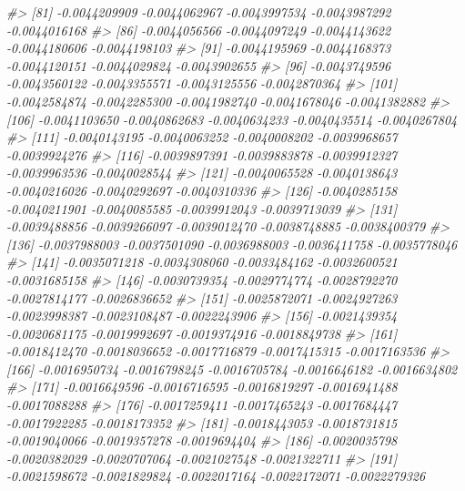\documentclass[
]{article}
\newenvironment{Shaded}{\begin{snugshade}}{\end{snugshade}}
\newcommand{\CommentTok}[1]{\textcolor[rgb]{0.56,0.35,0.01}{\textit{#1}}}
\begin{document}
\begin{Shaded}
\begin{Highlighting}[]
\CommentTok{\#\textgreater{}  [81] {-}0.0044209909 {-}0.0044062967 {-}0.0043997534 {-}0.0043987292 {-}0.0044016168}
\CommentTok{\#\textgreater{}  [86] {-}0.0044056566 {-}0.0044097249 {-}0.0044143622 {-}0.0044180606 {-}0.0044198103}
\CommentTok{\#\textgreater{}  [91] {-}0.0044195969 {-}0.0044168373 {-}0.0044120151 {-}0.0044029824 {-}0.0043902655}
\CommentTok{\#\textgreater{}  [96] {-}0.0043749596 {-}0.0043560122 {-}0.0043355571 {-}0.0043125556 {-}0.0042870364}
\CommentTok{\#\textgreater{} [101] {-}0.0042584874 {-}0.0042285300 {-}0.0041982740 {-}0.0041678046 {-}0.0041382882}
\CommentTok{\#\textgreater{} [106] {-}0.0041103650 {-}0.0040862683 {-}0.0040634233 {-}0.0040435514 {-}0.0040267804}
\CommentTok{\#\textgreater{} [111] {-}0.0040143195 {-}0.0040063252 {-}0.0040008202 {-}0.0039968657 {-}0.0039924276}
\CommentTok{\#\textgreater{} [116] {-}0.0039897391 {-}0.0039883878 {-}0.0039912327 {-}0.0039963536 {-}0.0040028544}
\CommentTok{\#\textgreater{} [121] {-}0.0040065528 {-}0.0040138643 {-}0.0040216026 {-}0.0040292697 {-}0.0040310336}
\CommentTok{\#\textgreater{} [126] {-}0.0040285158 {-}0.0040211901 {-}0.0040085585 {-}0.0039912043 {-}0.0039713039}
\CommentTok{\#\textgreater{} [131] {-}0.0039488856 {-}0.0039266097 {-}0.0039012470 {-}0.0038748885 {-}0.0038400379}
\CommentTok{\#\textgreater{} [136] {-}0.0037988003 {-}0.0037501090 {-}0.0036988003 {-}0.0036411758 {-}0.0035778046}
\CommentTok{\#\textgreater{} [141] {-}0.0035071218 {-}0.0034308060 {-}0.0033484162 {-}0.0032600521 {-}0.0031685158}
\CommentTok{\#\textgreater{} [146] {-}0.0030739354 {-}0.0029774774 {-}0.0028792270 {-}0.0027814177 {-}0.0026836652}
\CommentTok{\#\textgreater{} [151] {-}0.0025872071 {-}0.0024927263 {-}0.0023998387 {-}0.0023108487 {-}0.0022243906}
\CommentTok{\#\textgreater{} [156] {-}0.0021439354 {-}0.0020681175 {-}0.0019992697 {-}0.0019374916 {-}0.0018849738}
\CommentTok{\#\textgreater{} [161] {-}0.0018412470 {-}0.0018036652 {-}0.0017716879 {-}0.0017415315 {-}0.0017163536}
\CommentTok{\#\textgreater{} [166] {-}0.0016950734 {-}0.0016798245 {-}0.0016705784 {-}0.0016646182 {-}0.0016634802}
\CommentTok{\#\textgreater{} [171] {-}0.0016649596 {-}0.0016716595 {-}0.0016819297 {-}0.0016941488 {-}0.0017088288}
\CommentTok{\#\textgreater{} [176] {-}0.0017259411 {-}0.0017465243 {-}0.0017684447 {-}0.0017922285 {-}0.0018173352}
\CommentTok{\#\textgreater{} [181] {-}0.0018443053 {-}0.0018731815 {-}0.0019040066 {-}0.0019357278 {-}0.0019694404}
\CommentTok{\#\textgreater{} [186] {-}0.0020035798 {-}0.0020382029 {-}0.0020707064 {-}0.0021027548 {-}0.0021322711}
\CommentTok{\#\textgreater{} [191] {-}0.0021598672 {-}0.0021829824 {-}0.0022017164 {-}0.0022172071 {-}0.0022279326}

\end{Highlighting}
\end{Shaded}
\end{document}

